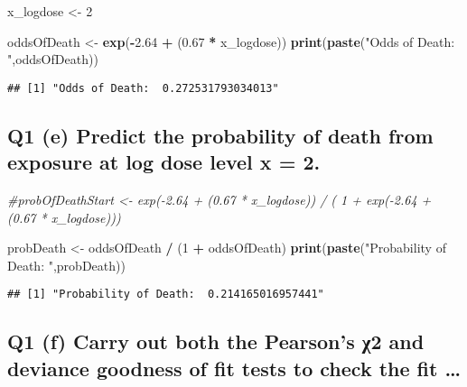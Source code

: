 \documentclass[
]{article}
\newenvironment{Shaded}{\begin{snugshade}}{\end{snugshade}}
\newcommand{\CommentTok}[1]{\textcolor[rgb]{0.56,0.35,0.01}{\textit{#1}}}
\newcommand{\DecValTok}[1]{\textcolor[rgb]{0.00,0.00,0.81}{#1}}
\newcommand{\FloatTok}[1]{\textcolor[rgb]{0.00,0.00,0.81}{#1}}
\newcommand{\KeywordTok}[1]{\textcolor[rgb]{0.13,0.29,0.53}{\textbf{#1}}}
\newcommand{\NormalTok}[1]{#1}
\newcommand{\OperatorTok}[1]{\textcolor[rgb]{0.81,0.36,0.00}{\textbf{#1}}}
\newcommand{\StringTok}[1]{\textcolor[rgb]{0.31,0.60,0.02}{#1}}
\begin{document}
\begin{Shaded}
\begin{Highlighting}[]
\NormalTok{x_logdose <-}\StringTok{ }\DecValTok{2}

\NormalTok{oddsOfDeath <-}\StringTok{ }\KeywordTok{exp}\NormalTok{(}\OperatorTok{-}\FloatTok{2.64} \OperatorTok{+}\StringTok{ }\NormalTok{(}\FloatTok{0.67} \OperatorTok{*}\StringTok{ }\NormalTok{x_logdose))}
\KeywordTok{print}\NormalTok{(}\KeywordTok{paste}\NormalTok{(}\StringTok{"Odds of Death: "}\NormalTok{,oddsOfDeath))}
\end{Highlighting}
\end{Shaded}

\begin{verbatim}
## [1] "Odds of Death:  0.272531793034013"
\end{verbatim}

\hypertarget{q1-e-predict-the-probability-of-death-from-exposure-at-log-dose-level-x-2.}{%
\subsection{Q1 (e) Predict the probability of death from exposure at log
dose level x =
2.}\label{q1-e-predict-the-probability-of-death-from-exposure-at-log-dose-level-x-2.}}

\begin{Shaded}
\begin{Highlighting}[]
\CommentTok{#probOfDeathStart <- exp(-2.64 + (0.67 * x_logdose)) / ( 1 + exp(-2.64 + (0.67 * x_logdose)))}

\NormalTok{probDeath <-}\StringTok{ }\NormalTok{oddsOfDeath }\OperatorTok{/}\StringTok{ }\NormalTok{(}\DecValTok{1} \OperatorTok{+}\StringTok{ }\NormalTok{oddsOfDeath)}
\KeywordTok{print}\NormalTok{(}\KeywordTok{paste}\NormalTok{(}\StringTok{"Probability of Death: "}\NormalTok{,probDeath))}
\end{Highlighting}
\end{Shaded}

\begin{verbatim}
## [1] "Probability of Death:  0.214165016957441"
\end{verbatim}

\hypertarget{q1-f-carry-out-both-the-pearsons-ux3c72-and-deviance-goodness-of-fit-tests-to-check-the-fit}{%
\subsection{Q1 (f) Carry out both the Pearson's χ2 and deviance goodness
of fit tests to check the fit
\ldots{}}\label{q1-f-carry-out-both-the-pearsons-ux3c72-and-deviance-goodness-of-fit-tests-to-check-the-fit}}
\end{document}
